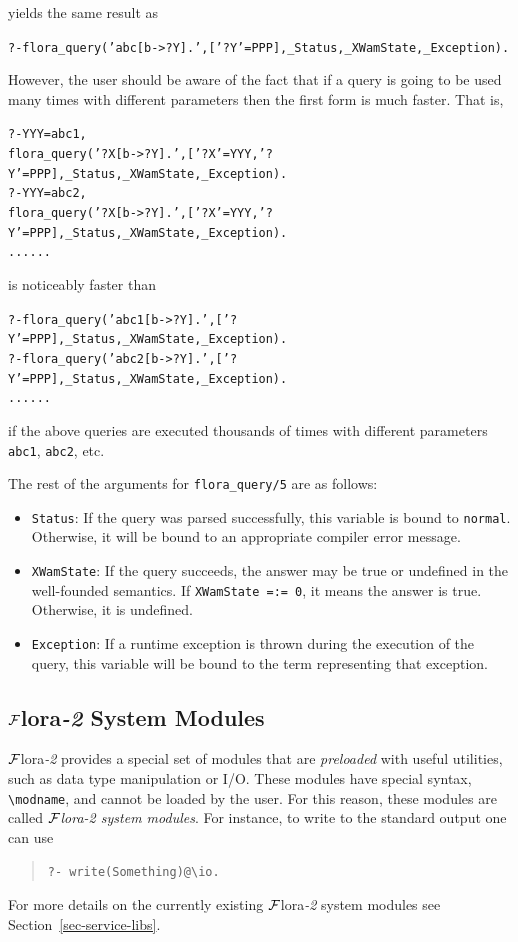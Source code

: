 \documentclass[11pt]{article}
\newcommand{\FLORA}{{\mbox{\sc ${\cal F}${lora}\rm\emph{-2}}}\xspace}
\newcommand{\FLSYSTEM}{\FLORA}
\newcommand{\FLQUERYCMD}{flora\_query}
\newcommand{\bs}{\textbackslash}
\begin{document}
yields the same result as
\begin{alltt}
?- \FLQUERYCMD('abc[b->?Y].',['?Y'=PPP],_Status,_XWamState,_Exception).
\end{alltt}
However, the user should be aware of the fact that if a query is going to
be used many times with different parameters then the first form is much
faster. That is,
\begin{alltt}
?- YYY=abc1,
   \FLQUERYCMD('?X[b->?Y].',['?X'=YYY,'?Y'=PPP], _Status,_XWamState,_Exception).
?- YYY=abc2,
   \FLQUERYCMD('?X[b->?Y].',['?X'=YYY,'?Y'=PPP], _Status,_XWamState,_Exception).
......
\end{alltt}
is noticeably faster than
\begin{alltt}
?- \FLQUERYCMD('abc1[b->?Y].',['?Y'=PPP],_Status,_XWamState,_Exception).
?- \FLQUERYCMD('abc2[b->?Y].',['?Y'=PPP],_Status,_XWamState,_Exception).
......
\end{alltt}
if the above queries are executed thousands of times with different
parameters {\tt abc1}, {\tt abc2}, etc.

The rest of the arguments for \texttt{flora\_query/5}  are as follows:
\begin{itemize}
\item  \texttt{Status}: If the query was parsed successfully, this variable
  is bound to \texttt{normal}. Otherwise, it will be bound to an appropriate
  compiler error message.
\item  \texttt{XWamState}: If the query succeeds, the answer may be true or
  undefined in the well-founded semantics. If \texttt{XWamState =:= 0}, it
  means the answer is true. Otherwise, it is undefined.
\item \texttt{Exception}: If a runtime exception is thrown during the
  execution of the query, this variable will be bound to the term
  representing that exception. 
\end{itemize}

\subsection{\FLSYSTEM System Modules}\label{sec-flora-system-modules}

\index{module! \bs{}modulename}
\FLSYSTEM provides a special set of modules that are \emph{preloaded} with
useful utilities, such as data type manipulation or I/O. These modules have special
syntax, {\tt \bs{}modname}, and cannot be loaded by the user. For this
reason, these modules are called \emph{\FLSYSTEM system modules}.  For
instance, to write to the standard output one can use
\begin{quote}
 \tt      ?- write(Something)@\bs{}io.
\end{quote}
For more details on the currently existing \FLSYSTEM system modules see
Section~\ref{sec-service-libs}.
\end{document}
